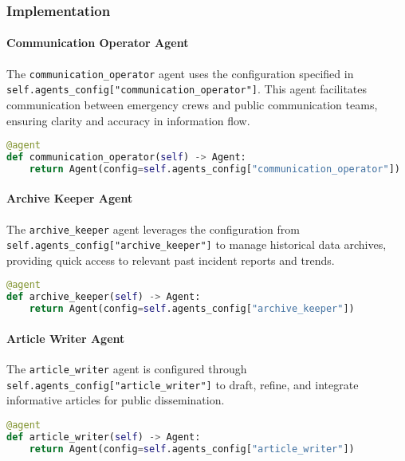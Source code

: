 \subsubsection{Implementation}

\paragraph{Communication Operator Agent}
The \texttt{communication\_operator} agent uses the configuration specified in \newline \texttt{self.agents\_config["communication\_operator"]}. This agent facilitates communication between emergency crews and public communication teams, ensuring clarity and accuracy in information flow.

\begin{lstlisting}[language=Python]
@agent
def communication_operator(self) -> Agent:
    return Agent(config=self.agents_config["communication_operator"])
\end{lstlisting}

\paragraph{Archive Keeper Agent}
The \texttt{archive\_keeper} agent leverages the configuration from \newline \texttt{self.agents\_config["archive\_keeper"]} to manage historical data archives, providing quick access to relevant past incident reports and trends.

\begin{lstlisting}[language=Python]
@agent
def archive_keeper(self) -> Agent:
    return Agent(config=self.agents_config["archive_keeper"])
\end{lstlisting}

\paragraph{Article Writer Agent}
The \texttt{article\_writer} agent is configured through \newline \texttt{self.agents\_config["article\_writer"]} to draft, refine, and integrate informative articles for public dissemination.

\begin{lstlisting}[language=Python]
@agent
def article_writer(self) -> Agent:
    return Agent(config=self.agents_config["article_writer"])
\end{lstlisting}

